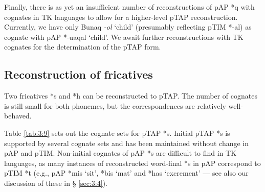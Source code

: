 Finally, there is as yet an insufficient number of reconstructions of pAP *q with cognates in TK languages to allow for a higher-level pTAP reconstruction. Currently, we have only Bunaq \textit{{}-ol} `child' (presumably reflecting pTIM *-al) as cognate with pAP *-uaqal `child'. We await further reconstructions with TK cognates for the determination of the pTAP form.

\subsection{Reconstruction of fricatives}
Two fricatives *s and *h can be reconstructed to pTAP. The number of cognates is still small for both phonemes, but the correspondences are relatively well-behaved. 

Table \ref{tab:3:9} sets out the cognate sets for pTAP *s. Initial pTAP *s is supported by several cognate sets and has been maintained without change in pAP and pTIM. Non-initial cognates of pAP *s are difficult to find in TK languages, as many instances of reconstructed word-final *s in pAP correspond to pTIM *t (e.g., pAP *mis `sit', *bis `mat' and *has `excrement'  ---  see also our discussion of these in {\S} \ref{sec:3:4}).
 

